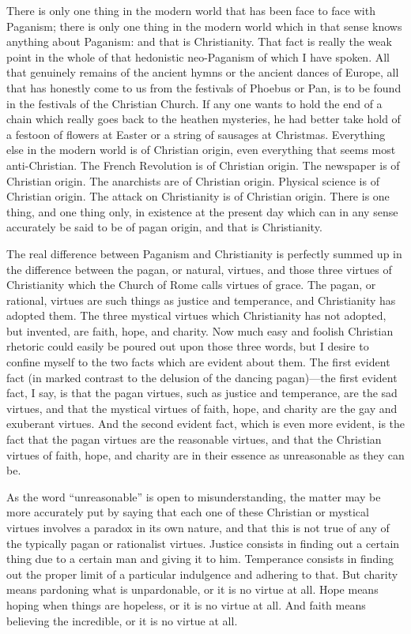 There is only one thing in the modern world that has been face to face with Paganism; there is only one thing in the modern world which in that sense knows anything about Paganism: and that is Christianity. That fact is really the weak point in the whole of that hedonistic neo-Paganism of which I have spoken. All that genuinely remains of the ancient hymns or the ancient dances of Europe, all that has honestly come to us from the festivals of Phoebus or Pan, is to be found in the festivals of the Christian Church. If any one wants to hold the end of a chain which really goes back to the heathen mysteries, he had better take hold of a festoon of flowers at Easter or a string of sausages at Christmas. Everything else in the modern world is of Christian origin, even everything that seems most anti-Christian. The French Revolution is of Christian origin. The newspaper is of Christian origin. The anarchists are of Christian origin. Physical science is of Christian origin. The attack on Christianity is of Christian origin. There is one thing, and one thing only, in existence at the present day which can in any sense accurately be said to be of pagan origin, and that is Christianity.

The real difference between Paganism and Christianity is perfectly summed up in the difference between the pagan, or natural, virtues, and those three virtues of Christianity which the Church of Rome calls virtues of grace. The pagan, or rational, virtues are such things as justice and temperance, and Christianity has adopted them. The three mystical virtues which Christianity has not adopted, but invented, are faith, hope, and charity. Now much easy and foolish Christian rhetoric could easily be poured out upon those three words, but I desire to confine myself to the two facts which are evident about them. The first evident fact (in marked contrast to the delusion of the dancing pagan)—the first evident fact, I say, is that the pagan virtues, such as justice and temperance, are the sad virtues, and that the mystical virtues of faith, hope, and charity are the gay and exuberant virtues. And the second evident fact, which is even more evident, is the fact that the pagan virtues are the reasonable virtues, and that the Christian virtues of faith, hope, and charity are in their essence as unreasonable as they can be.

As the word “unreasonable” is open to misunderstanding, the matter may be more accurately put by saying that each one of these Christian or mystical virtues involves a paradox in its own nature, and that this is not true of any of the typically pagan or rationalist virtues. Justice consists in finding out a certain thing due to a certain man and giving it to him. Temperance consists in finding out the proper limit of a particular indulgence and adhering to that. But charity means pardoning what is unpardonable, or it is no virtue at all. Hope means hoping when things are hopeless, or it is no virtue at all. And faith means believing the incredible, or it is no virtue at all.

